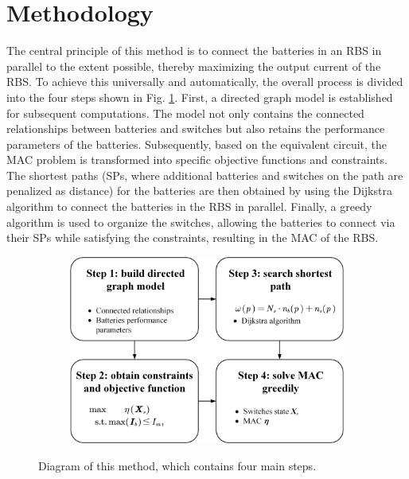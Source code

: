 \documentclass{article}
\begin{document}
\section{Methodology}

The central principle of this method is to connect the batteries in an RBS in parallel to the extent possible, thereby maximizing the output current of the RBS.
To achieve this universally and automatically, the overall process is divided into the four steps shown in Fig. \ref{fig:main}.
First, a directed graph model is established for subsequent computations. The model not only contains the connected relationships between batteries and switches but also retains the performance parameters of the batteries.
Subsequently, based on the equivalent circuit, the MAC problem is transformed into specific objective functions and constraints.
The shortest paths (SPs, where additional batteries and switches on the path are penalized as distance) for the batteries are then obtained  by using the Dijkstra algorithm to connect the batteries in the RBS in parallel.
Finally, a greedy algorithm is used to organize the switches, allowing the batteries to connect via their SPs while satisfying the constraints, resulting in the MAC of the RBS.

\begin{figure}[htbp]
    \centering
    \begin{subfigure}[b]{0.8\textwidth}
        \includegraphics[width=\textwidth]{main.png}
    \end{subfigure}
    \caption{ 
        Diagram of this method, which contains four main steps.
    }
    \label{fig:main}
\end{figure}
\end{document}
